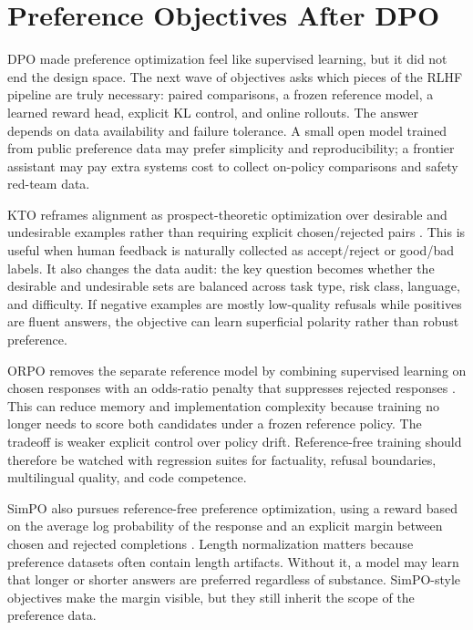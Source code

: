 \section{Preference Objectives After DPO}
\label{sec:preference-objectives-after-dpo}

DPO made preference optimization feel like supervised learning, but it did not end the design space. The next wave of objectives asks which pieces of the RLHF pipeline are truly necessary: paired comparisons, a frozen reference model, a learned reward head, explicit KL control, and online rollouts. The answer depends on data availability and failure tolerance. A small open model trained from public preference data may prefer simplicity and reproducibility; a frontier assistant may pay extra systems cost to collect on-policy comparisons and safety red-team data.

KTO reframes alignment as prospect-theoretic optimization over desirable and undesirable examples rather than requiring explicit chosen/rejected pairs \cite{ethayarajh2024kto}. This is useful when human feedback is naturally collected as accept/reject or good/bad labels. It also changes the data audit: the key question becomes whether the desirable and undesirable sets are balanced across task type, risk class, language, and difficulty. If negative examples are mostly low-quality refusals while positives are fluent answers, the objective can learn superficial polarity rather than robust preference.

ORPO removes the separate reference model by combining supervised learning on chosen responses with an odds-ratio penalty that suppresses rejected responses \cite{hong2024orpo}. This can reduce memory and implementation complexity because training no longer needs to score both candidates under a frozen reference policy. The tradeoff is weaker explicit control over policy drift. Reference-free training should therefore be watched with regression suites for factuality, refusal boundaries, multilingual quality, and code competence.

SimPO also pursues reference-free preference optimization, using a reward based on the average log probability of the response and an explicit margin between chosen and rejected completions \cite{meng2024simpo}. Length normalization matters because preference datasets often contain length artifacts. Without it, a model may learn that longer or shorter answers are preferred regardless of substance. SimPO-style objectives make the margin visible, but they still inherit the scope of the preference data.

